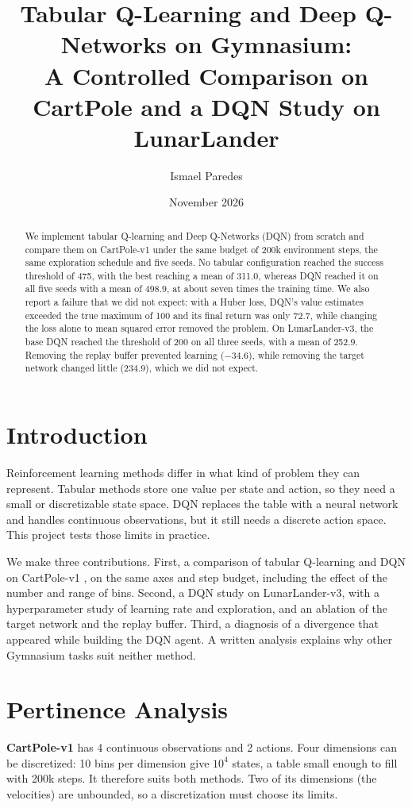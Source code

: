 \documentclass[10pt,twocolumn]{article}
\title{Tabular Q-Learning and Deep Q-Networks on Gymnasium:\\A Controlled Comparison on CartPole and a DQN Study on LunarLander}
\author{Ismael Paredes}
\date{November 2026}
\begin{document}
\maketitle

\begin{abstract}
We implement tabular Q-learning and Deep Q-Networks (DQN) from scratch and compare them on CartPole-v1 under the same budget of 200k environment steps, the same exploration schedule and five seeds. No tabular configuration reached the success threshold of 475, with the best reaching a mean of 311.0, whereas DQN reached it on all five seeds with a mean of 498.9, at about seven times the training time. We also report a failure that we did not expect: with a Huber loss, DQN's value estimates exceeded the true maximum of 100 and its final return was only 72.7, while changing the loss alone to mean squared error removed the problem. On LunarLander-v3, the base DQN reached the threshold of 200 on all three seeds, with a mean of 252.9. Removing the replay buffer prevented learning ($-34.6$), while removing the target network changed little (234.9), which we did not expect.
\end{abstract}

\section{Introduction}
Reinforcement learning methods differ in what kind of problem they can represent. Tabular methods store one value per state and action, so they need a small or discretizable state space. DQN \cite{mnih2015} replaces the table with a neural network and handles continuous observations, but it still needs a discrete action space. This project tests those limits in practice.

We make three contributions. First, a comparison of tabular Q-learning and DQN on CartPole-v1 \cite{towers2024}, on the same axes and step budget, including the effect of the number and range of bins. Second, a DQN study on LunarLander-v3, with a hyperparameter study of learning rate and exploration, and an ablation of the target network and the replay buffer. Third, a diagnosis of a divergence that appeared while building the DQN agent. A written analysis explains why other Gymnasium tasks suit neither method.

\section{Pertinence Analysis}
\textbf{CartPole-v1} has 4 continuous observations and 2 actions. Four dimensions can be discretized: 10 bins per dimension give $10^4$ states, a table small enough to fill with 200k steps. It therefore suits both methods. Two of its dimensions (the velocities) are unbounded, so a discretization must choose its limits.
\end{document}
